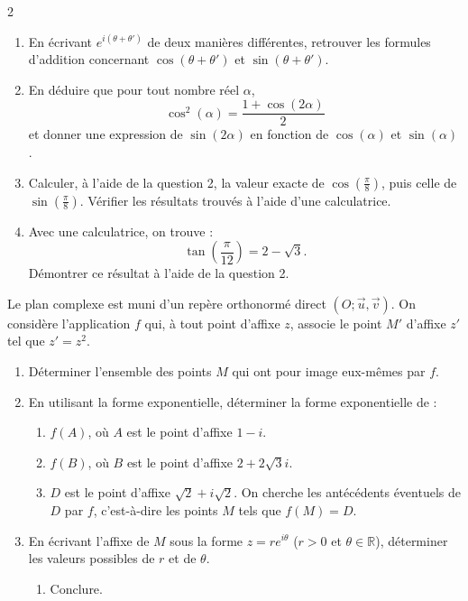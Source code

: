 \documentclass[a4paper,12pt]{article}
\begin{document}
\begin{multicols}{2}
\begin{exercice}[title=Exercice 24 \quad$\star\star$\quad\ ]{}{}
\begin{enumerate}
    \item En écrivant \( e^{i(\theta + \theta')} \) de deux manières différentes, retrouver les formules d'addition concernant \( \cos(\theta + \theta') \) et \( \sin(\theta + \theta') \).
    \item En déduire que pour tout nombre réel \( \alpha \),
       \[
       \cos^2(\alpha) = \frac{1 + \cos(2\alpha)}{2}
       \]
       et donner une expression de \( \sin(2\alpha) \) en fonction de \( \cos(\alpha) \) et \( \sin(\alpha) \).
    \item Calculer, à l'aide de la question 2, la valeur exacte de \( \cos\left(\frac{\pi}{8}\right) \), puis celle de \( \sin\left(\frac{\pi}{8}\right) \).  
       Vérifier les résultats trouvés à l'aide d'une calculatrice.
    \item Avec une calculatrice, on trouve :
       \[
       \tan\left(\frac{\pi}{12}\right) = 2 - \sqrt{3}.
       \]
       Démontrer ce résultat à l'aide de la question 2.
\end{enumerate}
\end{exercice}

\begin{exercice}[title=Exercice 25 \quad$\star$\quad\ ]{}{}
Le plan complexe est muni d'un repère orthonormé direct \( (O ; \vec{u}, \vec{v}) \). On considère l'application \( f \) qui, à tout point d'affixe \( z \), associe le point \( M' \) d'affixe \( z' \) tel que \( z' = z^2 \).

\begin{enumerate}
    \item Déterminer l'ensemble des points \( M \) qui ont pour image eux-mêmes par \( f \).
    \item En utilisant la forme exponentielle, déterminer la forme exponentielle de :
       \begin{enumerate}
           \item \( f(A) \), où \( A \) est le point d'affixe \( 1 - i \).
           \item \( f(B) \), où \( B \) est le point d'affixe \( 2 + 2\sqrt{3}i \).
           \item \( D \) est le point d'affixe \( \sqrt{2} + i\sqrt{2} \). On cherche les antécédents éventuels de \( D \) par \( f \), c'est-à-dire les points \( M \) tels que \( f(M) = D \).
       \end{enumerate}
    \item En écrivant l'affixe de \( M \) sous la forme \( z = re^{i\theta} \) (\( r > 0 \) et \( \theta \in \mathbb{R} \)), déterminer les valeurs possibles de \( r \) et de \( \theta \).
       \begin{enumerate}
           \item Conclure.
       \end{enumerate}
\end{enumerate}
\end{exercice}


\end{multicols}
\end{document}
